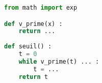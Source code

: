 \begin{lstlisting}[language=python]
from math import exp

def v_prime(x) :
	return ...
	
def seuil() :
	t = 0
	while v_prime(t) ... :
		t = ...	
	return t
\end{lstlisting}